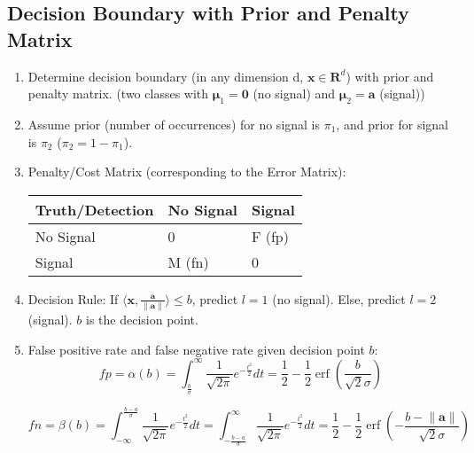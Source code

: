 \documentclass[11pt]{article}
\DeclareMathOperator{\erf}{erf}
\begin{document}
\subsection{Decision Boundary with Prior and Penalty Matrix}

\begin{enumerate}
    \item Determine decision boundary (in any dimension d, $\mathbf{x} \in \mathbf{R}^d$) with prior and penalty matrix. (two classes with $\mathbf{\mu}_1 = \mathbf{0}$ (no signal) and $\mathbf{\mu}_2 = \mathbf{a}$ (signal))
    \item Assume prior (number of occurrences) for no signal is $\pi_1$, and prior for signal is $\pi_2$ ($\pi_2 = 1-\pi_1$). 
    \item Penalty/Cost Matrix (corresponding to the Error Matrix):
    
    \begin{tabular}{l|l|l}
    Truth/Detection&No Signal&Signal\\\hline
    No Signal&0&F (fp)\\\hline
    Signal&M (fn)&0\\
    \end{tabular}
    \item Decision Rule: If $\langle \mathbf{x}, \frac{\mathbf{a} }{\lVert \mathbf{a} \rVert}\rangle \le b$, predict $l=1$ (no signal). Else, predict $l=2$ (signal). $b$ is the decision point.
    \item False positive rate and false negative rate given decision point $b$:
    \begin{equation}
        fp = \alpha(b) = \int_{\frac{b}{\sigma}}^{\infty} \frac{1}{\sqrt{2\pi}} e^{-\frac{t^2}{2}}dt = \frac{1}{2} - \frac{1}{2} \erf(\frac{b}{\sqrt{2}\sigma})
    \end{equation}
    
    \begin{equation}
        fn= \beta(b) = \int_{-\infty}^{\frac{b-a}{\sigma}} \frac{1}{\sqrt{2\pi}} e^{-\frac{t^2}{2}}dt = \int_{-\frac{b-a}{\sigma}}^{\infty} \frac{1}{\sqrt{2\pi}} e^{-\frac{t^2}{2}}dt = \frac{1}{2} - \frac{1}{2} \erf(-\frac{b-\lVert \mathbf{a} \rVert}{\sqrt{2}\sigma})
    \end{equation}
    

\end{enumerate}
\end{document}
